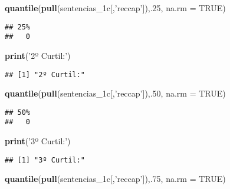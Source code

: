 \documentclass[runningheads,a4paper]{llncs}
\newenvironment{Shaded}{}{}
\newcommand{\KeywordTok}[1]{\textcolor[rgb]{0.00,0.44,0.13}{\textbf{{#1}}}}
\newcommand{\DataTypeTok}[1]{\textcolor[rgb]{0.56,0.13,0.00}{{#1}}}
\newcommand{\DecValTok}[1]{\textcolor[rgb]{0.25,0.63,0.44}{{#1}}}
\newcommand{\StringTok}[1]{\textcolor[rgb]{0.25,0.44,0.63}{{#1}}}
\newcommand{\OtherTok}[1]{\textcolor[rgb]{0.00,0.44,0.13}{{#1}}}
\newcommand{\NormalTok}[1]{{#1}}
\begin{document}
\begin{Shaded}
\begin{Highlighting}[]
\KeywordTok{quantile}\NormalTok{(}\KeywordTok{pull}\NormalTok{(sentencias_1c[,}\StringTok{'reccap'}\NormalTok{]),.}\DecValTok{25}\NormalTok{, }\DataTypeTok{na.rm =} \OtherTok{TRUE}\NormalTok{)}
\end{Highlighting}
\end{Shaded}

\begin{verbatim}
## 25% 
##   0
\end{verbatim}

\begin{Shaded}
\begin{Highlighting}[]
\KeywordTok{print}\NormalTok{(}\StringTok{'2º Curtil:'}\NormalTok{)}
\end{Highlighting}
\end{Shaded}

\begin{verbatim}
## [1] "2º Curtil:"
\end{verbatim}

\begin{Shaded}
\begin{Highlighting}[]
\KeywordTok{quantile}\NormalTok{(}\KeywordTok{pull}\NormalTok{(sentencias_1c[,}\StringTok{'reccap'}\NormalTok{]),.}\DecValTok{50}\NormalTok{, }\DataTypeTok{na.rm =} \OtherTok{TRUE}\NormalTok{)}
\end{Highlighting}
\end{Shaded}

\begin{verbatim}
## 50% 
##   0
\end{verbatim}

\begin{Shaded}
\begin{Highlighting}[]
\KeywordTok{print}\NormalTok{(}\StringTok{'3º Curtil:'}\NormalTok{)}
\end{Highlighting}
\end{Shaded}

\begin{verbatim}
## [1] "3º Curtil:"
\end{verbatim}

\begin{Shaded}
\begin{Highlighting}[]
\KeywordTok{quantile}\NormalTok{(}\KeywordTok{pull}\NormalTok{(sentencias_1c[,}\StringTok{'reccap'}\NormalTok{]),.}\DecValTok{75}\NormalTok{, }\DataTypeTok{na.rm =} \OtherTok{TRUE}\NormalTok{)}
\end{Highlighting}
\end{Shaded}
\end{document}
